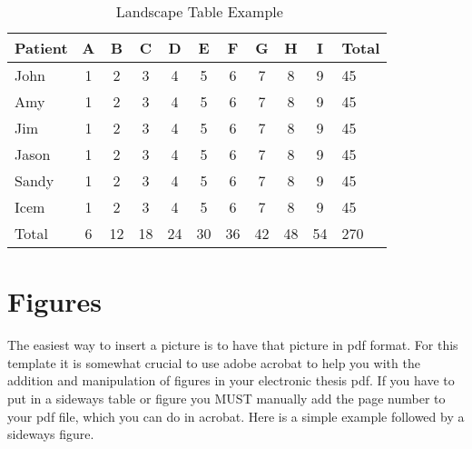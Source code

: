 \begin{landscape}
\begin{table}
\caption{$ $ Landscape Table Example}
\label{t:two}
\begin{center}
\begin{tabular}{lcccccccccl}
\hline
Patient & A & B & C & D & E & F & G & H &I & Total \\
\hline
John & 1 & 2 & 3 & 4 & 5 & 6 & 7 & 8 & 9 & 45 \\
Amy & 1 & 2 & 3 & 4 & 5 & 6 & 7 & 8 & 9 & 45 \\
Jim & 1 & 2 & 3 & 4 & 5 & 6 & 7 & 8 & 9 & 45 \\
Jason & 1 & 2 & 3 & 4 & 5 & 6 & 7 & 8 & 9 & 45 \\
Sandy & 1 & 2 & 3 & 4 & 5 & 6 & 7 & 8 & 9 & 45 \\
Icem & 1 & 2 & 3 & 4 & 5 & 6 & 7 & 8 & 9 & 45 \\
\hline
Total & 6 & 12 & 18 & 24 & 30 & 36 & 42 & 48 & 54 & 270\\
\end{tabular}
\end{center}
\end{table}
\end{landscape}


\section{Figures}

The easiest way to insert a picture is to have that picture in pdf format.  For this template it is somewhat crucial to use adobe acrobat to help you with the addition and manipulation of figures in your electronic thesis pdf.  If you have to put in a sideways table or figure you MUST manually add the page number to your pdf file, which you can do in acrobat.  Here is a simple example followed by a sideways figure.



